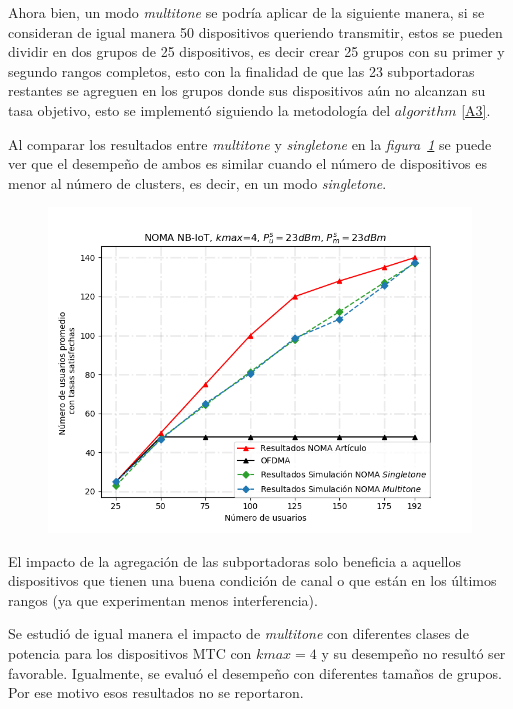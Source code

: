 Ahora bien, un modo \textit{multitone} se podría aplicar de la siguiente manera, si se consideran de igual manera 50 dispositivos queriendo transmitir, estos se pueden dividir en dos grupos de 25 dispositivos, es decir crear 25 grupos con su primer y segundo rangos completos, esto con la finalidad de que las 23 subportadoras restantes se agreguen en los grupos donde sus dispositivos aún no alcanzan su tasa objetivo, esto se implementó siguiendo la metodología del $algorithm$ \ref{A3}. \newline

Al comparar los resultados entre \textit{multitone} y \textit{singletone} en la \textit{figura~\ref{fig:ResultsNOMA}} se puede ver que el desempeño de ambos es similar cuando el número de dispositivos es menor al número de clusters, es decir, en un modo \textit{singletone}.\newline

\begin{figure}[th]
    \centering
    \includegraphics[scale=.7]{Figures/NOMA_results_comparation.png}
    \decoRule
    \caption[]{}
    \label{fig:ResultsNOMA}
\end{figure}

El impacto de la agregación de las subportadoras solo beneficia a aquellos dispositivos que tienen una buena condición de canal o que están en los últimos rangos (ya que experimentan menos interferencia). \newline

Se estudió de igual manera el impacto de \textit{multitone} con diferentes clases de potencia para los dispositivos MTC con $kmax = 4$ y su desempeño no resultó ser favorable. Igualmente, se evaluó el desempeño con diferentes tamaños de grupos. Por ese motivo esos resultados no se reportaron.\newline

